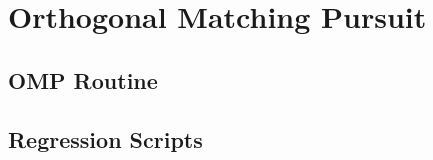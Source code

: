\documentclass[11pt,a4paper]{report}
\begin{document}
\section{Orthogonal Matching Pursuit}

\subsection{OMP Routine}


\newpage
\subsection{Regression Scripts}


\end{document}
